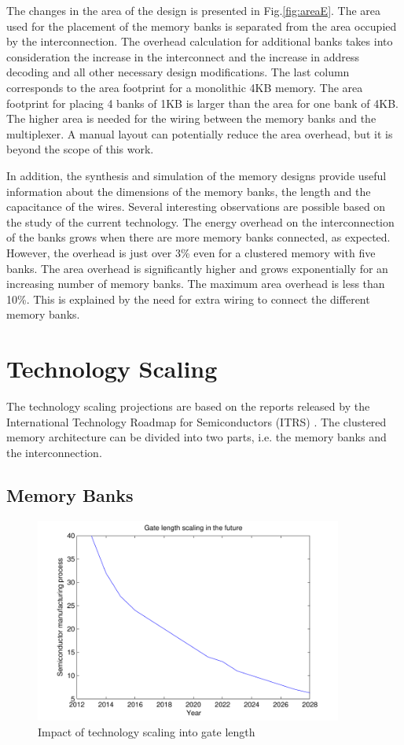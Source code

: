 The changes in the area of the design is presented in Fig.\ref{fig:areaE}.
The area used for the placement of the memory banks is separated from the area occupied by the interconnection.
The overhead calculation for additional banks takes into consideration the increase in the interconnect and the increase in address decoding and all other necessary design modifications.
The last column corresponds to the area footprint for a monolithic 4KB memory.
The area footprint for placing 4 banks of 1KB is larger than the area for one bank of 4KB.
The higher area is needed for the wiring between the memory banks and the multiplexer.
A manual layout can potentially reduce the area overhead, but it is beyond the scope of this work.

In addition, the synthesis and simulation of the memory designs provide useful information about the dimensions of the memory banks, the length and the capacitance of the wires.
Several interesting observations are possible based on the study of the current technology.
The energy overhead on the interconnection of the banks grows when there are more memory banks connected, as expected.
However, the overhead is just over 3\% even for a clustered memory with five banks. 
The area overhead is significantly higher and grows exponentially for an increasing number of memory banks.  
The maximum area overhead is less than 10\%.
This is explained by the need for extra wiring to connect the different memory banks.

\section{Technology Scaling}
\label{future}

The technology scaling projections are based on the reports released by the International Technology Roadmap for Semiconductors (ITRS)  \cite{itrs}.
The clustered memory architecture can be divided into two parts, i.e. the memory banks and the interconnection.

\subsection{Memory Banks}

\begin{figure}
 \centering
 \includegraphics[width = 0.9\textwidth]{E/gate.pdf}
  \caption{Impact of technology scaling into gate length}
 \label{fig:gateE}
 \end{figure}
 
